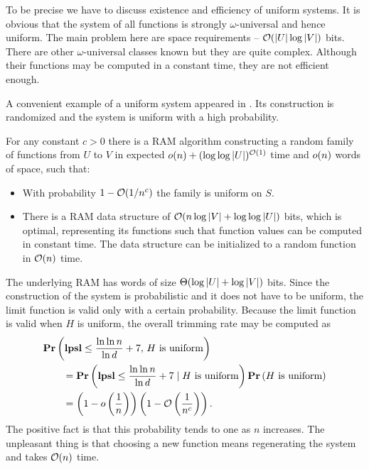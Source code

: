 To be precise we have to discuss existence and efficiency of uniform systems. It is obvious that the system of all functions is strongly $\omega$-universal and hence uniform. The main problem here are space requirements -- $\mathcal{O}(|U| \log |V|)$ bits. There are other $\omega$-universal classes known but they are quite complex. Although their functions may be computed in a constant time, they are not efficient enough. 

A convenient example of a uniform system appeared in \cite{DBLP:journals/siamcomp/PaghP08}. Its construction is randomized and the system is uniform with a high probability.
\begin{theorem}
\label{theorem-uniform-system}
For any constant $c > 0$ there is a RAM algorithm constructing a random family of functions from $U$ to $V$ in expected $o(n) + (\log \log|U|)^{\mathcal{O}(1)}$ time and $o(n)$ words of space, such that:
\begin{itemize}
\item With probability $1 - \mathcal{O}(1 / n^c)$ the family is uniform on $S$.
\item There is a RAM data structure of $\mathcal{O}(n \log|V| + \log \log|U|)$ bits, which is optimal, representing its functions such that function values can be computed in constant time. The data structure can be initialized to a random function in $\mathcal{O}(n)$ time.
\end{itemize}
\end{theorem}

The underlying RAM has words of size $\mathrm{\Theta}(\log |U| + \log |V|)$ bits. Since the construction of the system is probabilistic and it does not have to be uniform, the limit function is valid only with a certain probability. Because the limit function is valid when $H$ is uniform, the overall trimming rate may be computed as
\[
\begin{split} 
& \mathbf{Pr}\left(\mathbf{lpsl} \leq \frac{\ln \ln n}{\ln d} + 7,\, H \mbox{ is uniform}\right) \\
	& \qquad = \mathbf{Pr}\left(\mathbf{lpsl} \leq \frac{\ln \ln n}{\ln d} + 7 \mid H \mbox{ is uniform}\right) \mathbf{Pr}\left(H \mbox{ is uniform}\right) \\ 
	& \qquad = \left(1 - o\left(\frac{1}{n}\right)\right)\left(1 - \mathcal{O}\left(\frac{1}{n^c}\right)\right). \\
\end{split}
\]
The positive fact is that this probability tends to one as $n$ increases. The unpleasant thing is that choosing a new function means regenerating the system and takes $\mathcal{O}(n)$ time.


